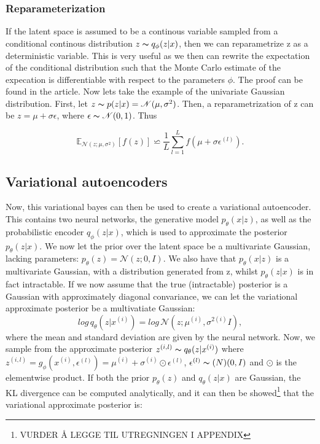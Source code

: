 \subsubsection*{Reparameterization}\label{sec:reparameterization}
If the latent space is assumed to be a continous variable sampled from a conditional continous distribution 
$z \thicksim q_{\phi}(z|x)$, then we can reparametrize z as a deterministic variable. This is very useful as 
we then can rewrite the expectation of the conditional distribution such that the Monte Carlo estimate of 
the expecation is differentiable with respect to the parameters $\phi$. The proof can be found in the article\cite{VAE}.  
Now lets take the example of the univariate Gaussian distribution. First, let $z \thicksim p(z|x) = \mathcal{N}(\mu, \sigma^2)$. 
Then, a reparametrization of z can be $z = \mu + \sigma\epsilon$, where $\epsilon \thicksim \mathcal{N}(0,1)$. 
Thus 

\begin{equation*}
    \mathbb{E}_{\mathcal{N}(z; \mu, \sigma^2)}[f(z)] \backsimeq  \frac{1}{L}\sum_{l=1}^L f(\mu + \sigma\epsilon^{(l)}).
\end{equation*}

\subsection*{Variational autoencoders}
Now, this variational bayes can then be used to create a variational autoencoder. This contains two neural networks, the generative model $p_{\theta}(x|z)$,
as well as the probabilistic encoder $q_{\phi}(z|x)$, which is used to approximate the posterior $p_{\theta}(z|x)$. We now let the prior over 
the latent space be a multivariate Gaussian, lacking parameters: $p_{\theta}(z) = \mathcal{N}(z;0,I)$. We also have that $p_{\theta}(x|z)$ is a multivariate Gaussian,
with a distribution generated from z, whilst $p_{\theta}(z|x)$ is in fact intractable. If we now assume that the true (intractable) posterior 
is a Gaussian with approximately diagonal convariance, we can let the variational approximate posterior be a multivatiate Gaussian:
\begin{equation}
    log\, q_{\theta}(z|x^{(i)}) = log\, \mathcal{N}(z;\mu^{(i)},\sigma^{2(i)}I),
\end{equation}
where the mean and standard deviation are given by the neural network. Now, we sample from the approximate posterior $z^{(i,l)} \thicksim q_{\theta}(z|x^{(i)})$
where $z^{(i,l)} = g_{\phi}(x^{(i)}, \epsilon^{(l)}) = \mu^{(i)} + \sigma^{(i)} \odot \epsilon^{(l)}$, $\epsilon^{(l)} \thicksim \mathcal(N)(0,I)$ and $\odot$
is the elementwise product. If both the prior $p_{\theta}(z)$ and $q_{\theta}(z|x)$ are Gaussian, the KL divergence can be computed analytically, and it 
can then be showed\footnote{VURDER Å LEGGE TIL UTREGNINGEN I APPENDIX}\cite{VAE} that the variational approximate posterior is:

